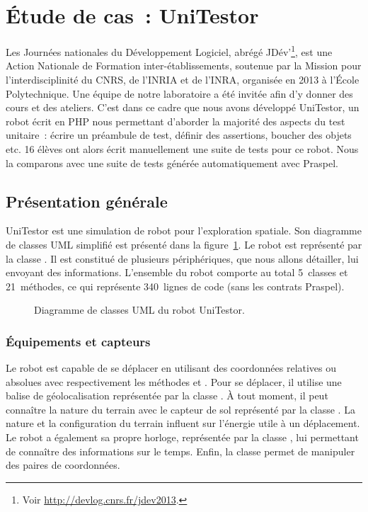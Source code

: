 \section{Étude de cas~: UniTestor}
\label{section:experimentation:unitestor}

Les Journées nationales du Développement Logiciel, abrégé JDév'\footnote{Voir
\url{http://devlog.cnrs.fr/jdev2013}.}, est une Action Nationale de Formation
inter-établissements, soutenue par la Mission pour l'interdisciplinité du CNRS,
de l'INRIA et de l'INRA, organisée en 2013 à l'École Polytechnique. Une équipe
de notre laboratoire a été invitée afin d'y donner des cours et des ateliers.
C'est dans ce cadre que nous avons développé UniTestor, un robot écrit en PHP
nous permettant d'aborder la majorité des aspects du test unitaire~: écrire un
préambule de test, définir des assertions, boucher des objets etc. 16 élèves ont
alors écrit manuellement une suite de tests pour ce robot. Nous la comparons
avec une suite de tests générée automatiquement avec Praspel.

\subsection{Présentation générale}

UniTestor est une simulation de robot pour l'exploration spatiale. Son diagramme
de classes UML simplifié est présenté dans la
figure~\ref{figure:experimentation:unitestor}. Le robot est représenté par la
classe . Il est constitué de plusieurs périphériques, que nous
allons détailler, lui envoyant des informations. L'ensemble du robot comporte au
total 5~classes et 21~méthodes, ce qui représente 340~lignes de code (sans les
contrats Praspel).
%
\begin{figure}


\caption{\label{figure:experimentation:unitestor} Diagramme de classes UML du
robot UniTestor.}

\end{figure}

\subsubsection{Équipements et capteurs}

Le robot est capable de se déplacer en utilisant des coordonnées relatives ou
absolues avec respectivement les méthodes  et . Pour se
déplacer, il utilise une balise de géolocalisation représentée par la classe
. À tout moment, il peut connaître la nature du terrain avec
le capteur de sol représenté par la classe . La nature et la
configuration du terrain influent sur l'énergie utile à un déplacement. Le robot
a également sa propre horloge, représentée par la classe , lui
permettant de connaître des informations sur le temps. Enfin, la classe
 permet de manipuler des paires de coordonnées.

